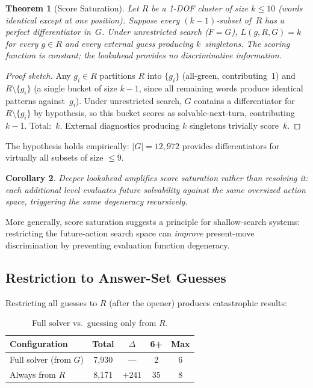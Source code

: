 \documentclass[11pt]{article}
\newtheorem{theorem}{Theorem}
\newtheorem{corollary}[theorem]{Corollary}
\begin{document}
	\begin{theorem}[Score Saturation]\label{thm:saturation}
		Let $R$ be a 1-DOF cluster of size $k \leq 10$ (words identical except at one position).  Suppose every $(k{-}1)$-subset of~$R$ has a perfect differentiator in~$G$.  Under unrestricted search ($F = G$), $L(g,R,G) = k$ for every $g \in R$ and every external guess producing $k$~singletons.  The scoring function is constant; the lookahead provides no discriminative information.
	\end{theorem}
	
	\begin{proof}[Proof sketch]
		Any $g_i \in R$ partitions $R$ into $\{g_i\}$ (all-green, contributing~1) and $R \setminus \{g_i\}$ (a single bucket of size $k-1$, since all remaining words produce identical patterns against~$g_i$).  Under unrestricted search, $G$ contains a differentiator for $R \setminus \{g_i\}$ by hypothesis, so this bucket scores as solvable-next-turn, contributing $k-1$.  Total:~$k$.  External diagnostics producing $k$ singletons trivially score~$k$.
	\end{proof}
	
	The hypothesis holds empirically: $|G| = 12{,}972$ provides differentiators for virtually all subsets of size $\leq 9$.
	
	\begin{corollary}\label{cor:deeper}
		Deeper lookahead amplifies score saturation rather than resolving it: each additional level evaluates future solvability against the same oversized action space, triggering the same degeneracy recursively.
	\end{corollary}
	
	More generally, score saturation suggests a principle for shallow-search systems: restricting the future-action search space can \emph{improve} present-move discrimination by preventing evaluation function degeneracy.
	
	\subsection{Restriction to Answer-Set Guesses}
	
	Restricting all guesses to $R$ (after the opener) produces catastrophic results:
	
	\begin{table}[h]
		\centering
		\caption{Full solver vs.\ guessing only from $R$.}
		\label{tab:restrict}
		\begin{tabular}{@{}lcccc@{}}
			\toprule
			Configuration & Total & $\Delta$ & 6+ & Max \\
			\midrule
			Full solver (from $G$) & 7,930 & --- & 2 & 6 \\
			Always from $R$ & 8,171 & $+241$ & 35 & 8 \\
			\bottomrule
		\end{tabular}
	\end{table}
	
\end{document}
